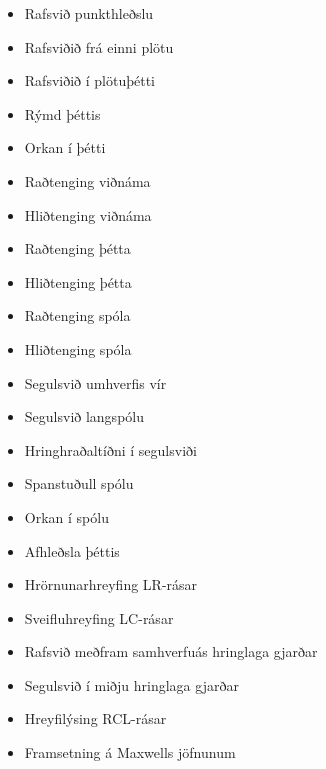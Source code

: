 \begin{multicols}{3}
\begin{itemize}
    \item Rafsvið punkthleðslu
    \item Rafsviðið frá einni plötu
    \item Rafsviðið í plötuþétti
    \item Rýmd þéttis
    \item Orkan í þétti
    \item Raðtenging viðnáma
    \item Hliðtenging viðnáma
    \item Raðtenging þétta
    \item Hliðtenging þétta
    \item Raðtenging spóla
    \item Hliðtenging spóla
    \item Segulsvið umhverfis vír
    \item Segulsvið langspólu
    \item Hringhraðaltíðni í segulsviði
    \item Spanstuðull spólu
    \item Orkan í spólu
    \item Afhleðsla þéttis
    \item Hrörnunarhreyfing LR-rásar
    \item Sveifluhreyfing LC-rásar
    \item Rafsvið meðfram samhverfuás hringlaga gjarðar
    \item Segulsvið í miðju hringlaga gjarðar
    \item Hreyfilýsing RCL-rásar
    \item Framsetning á Maxwells jöfnunum
\end{itemize}

\end{multicols}